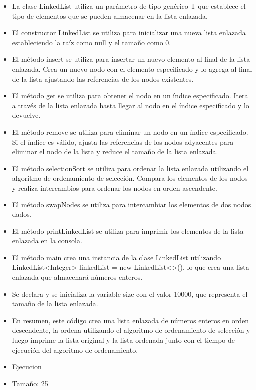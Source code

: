 \documentclass{article}
\begin{document}
	\begin{itemize}
		\item La clase LinkedList utiliza un parámetro de tipo genérico T que establece el tipo de elementos que se pueden almacenar en la lista enlazada.
		\item El constructor LinkedList se utiliza para inicializar una nueva lista enlazada estableciendo la raíz como null y el tamaño como 0.	
		\item El método insert se utiliza para insertar un nuevo elemento al final de la lista enlazada. Crea un nuevo nodo con el elemento especificado y lo agrega al final de la lista ajustando las referencias de los nodos existentes.	
		\item El método get se utiliza para obtener el nodo en un índice especificado. Itera a través de la lista enlazada hasta llegar al nodo en el índice especificado y lo devuelve.
		\item El método remove se utiliza para eliminar un nodo en un índice especificado. Si el índice es válido, ajusta las referencias de los nodos adyacentes para eliminar el nodo de la lista y reduce el tamaño de la lista enlazada.
		\item El método selectionSort se utiliza para ordenar la lista enlazada utilizando el algoritmo de ordenamiento de selección. Compara los elementos de los nodos y realiza intercambios para ordenar los nodos en orden ascendente.
		\item El método swapNodes se utiliza para intercambiar los elementos de dos nodos dados.	
		\item El método printLinkedList se utiliza para imprimir los elementos de la lista enlazada en la consola.	
	\end{itemize}	
		
	
	
	\begin{itemize}
		\item El método main crea una instancia de la clase LinkedList utilizando LinkedList<Integer> linkedList = new LinkedList<>(), lo que crea una lista enlazada que almacenará números enteros.
		\item Se declara y se inicializa la variable size con el valor 10000, que representa el tamaño de la lista enlazada.	
		\item En resumen, este código crea una lista enlazada de números enteros en orden descendente, la ordena utilizando el algoritmo de ordenamiento de selección y luego imprime la lista original y la lista ordenada junto con el tiempo de ejecución del algoritmo de ordenamiento.
		\item Ejecucion
		\item Tamaño: 25
	\end{itemize}
	
\end{document}

